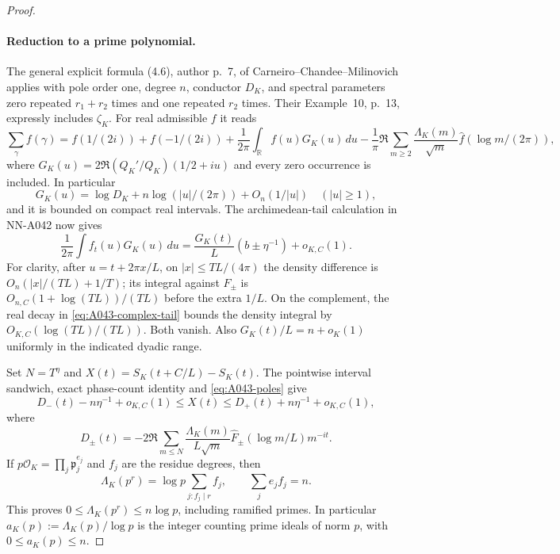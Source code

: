 \begin{proof}
\paragraph{Reduction to a prime polynomial.}
The general explicit formula (4.6), author p.~7, of
Carneiro--Chandee--Milinovich applies with pole order one,
degree $n$, conductor $D_K$, and spectral parameters zero
repeated $r_1+r_2$ times and one repeated $r_2$ times.
Their Example~10, p.~13, expressly includes $\zeta_K$.
For real admissible $f$ it reads
\[
 \sum_\gamma f(\gamma)
 =f(1/(2i))+f(-1/(2i))
   +\frac1{2\pi}\int_{\mathbb R}f(u)G_K(u)\,du
   -\frac1\pi\Re\sum_{m\ge2}\frac{\Lambda_K(m)}{\sqrt m}
                           \widehat f(\log m/(2\pi)),
\]
where $G_K(u)=2\Re(Q_K'/Q_K)(1/2+iu)$ and every zero
occurrence is included. In particular
\[
 G_K(u)=\log D_K+n\log(|u|/(2\pi))+O_n(1/|u|)
 \quad (|u|\ge1),
\]
and it is bounded on compact real intervals.
The archimedean-tail calculation in NN-A042 now gives
\[
 \frac1{2\pi}\int f_t(u)G_K(u)\,du
       =\frac{G_K(t)}{L}(b\pm\eta^{-1})+o_{K,C}(1).
\]
For clarity, after $u=t+2\pi x/L$, on
$|x|\le TL/(4\pi)$ the density difference is
$O_n(|x|/(TL)+1/T)$; its integral against $F_\pm$ is
$O_{n,C}(1+\log(TL))/(TL)$ before the extra $1/L$.
On the complement, the real decay in
\eqref{eq:A043-complex-tail} bounds the density integral by
$O_{K,C}(\log(TL)/(TL))$. Both vanish. Also
$G_K(t)/L=n+o_K(1)$ uniformly in the indicated dyadic range.

Set $N=T^\eta$ and $X(t)=S_K(t+C/L)-S_K(t)$. The
pointwise interval sandwich, exact phase-count identity and
\eqref{eq:A043-poles} give
\[
 D_-(t)-n\eta^{-1}+o_{K,C}(1)
       \le X(t)\le D_+(t)+n\eta^{-1}+o_{K,C}(1),
\]
where
\[
 D_\pm(t)=-2\Re\sum_{m\le N}
       \frac{\Lambda_K(m)}{L\sqrt m}
       \widehat F_\pm(\log m/L)m^{-it}.
\]
If $p\mathcal O_K=\prod_j\mathfrak p_j^{e_j}$ and
$f_j$ are the residue degrees, then
\[
 \Lambda_K(p^r)=\log p\sum_{j:f_j\mid r}f_j,
 \qquad \sum_j e_jf_j=n.
\]
This proves $0\le\Lambda_K(p^r)\le n\log p$, including
ramified primes. In particular
$a_K(p):=\Lambda_K(p)/\log p$ is the integer counting prime
ideals of norm $p$, with $0\le a_K(p)\le n$.


\end{proof}
